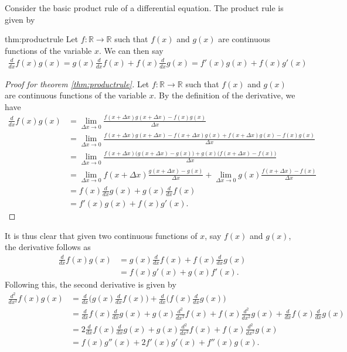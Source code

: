 Consider the basic product rule of a differential equation. The product rule is given by
\begin{theo}{thm:productrule}
	Let $f:\mathbb{R}\rightarrow\mathbb{R}$ such that $f(x)$ and $g(x)$ are continuous functions of the variable $x$. We can then say
	\begin{align*}
		\frac{d}{dx}f(x)g(x)=g(x)\frac{d}{dx}f(x)+f(x)\frac{d}{dx}g(x)=f'(x)g(x)+f(x)g'(x)
	\end{align*}
\end{theo}
\begin{proof}[Proof for theorem \ref{thm:productrule}]
	Let $f:\mathbb{R}\rightarrow\mathbb{R}$ such that $f(x)$ and $g(x)$ are continuous functions of the variable $x$. By the definition of the derivative, we have
	\begin{align*}
		\frac{d}{dx}f(x)g(x)&=\lim\limits_{\Delta x \rightarrow 0}\frac{f(x+\Delta x)g(x+\Delta x)-f(x)g(x)}{\Delta x} \\
		&=\lim\limits_{\Delta x \rightarrow 0}\frac{f(x+\Delta x)g(x+\Delta x)-f(x+\Delta x)g(x)+f(x+\Delta x)g(x)-f(x)g(x)}{\Delta x} \\
		&=\lim\limits_{\Delta x \rightarrow 0}\frac{f(x+\Delta x)\big(g(x+\Delta x)-g(x)\big)+g(x)\big(f(x+\Delta x)-f(x)\big)}{\Delta x} \\
		&=\lim\limits_{\Delta x \rightarrow 0}f(x+\Delta x)\frac{g(x+\Delta x)-g(x)}{\Delta x}+\lim\limits_{\Delta x \rightarrow 0}g(x)\frac{f(x+\Delta x)-f(x)}{\Delta x} \\
		&=f(x)\frac{d}{dx}g(x)+g(x)\frac{d}{dx}f(x) \\&=f'(x)g(x)+f(x)g'(x).
	\end{align*}
\end{proof}
It is thus clear that given two continuous functions of $x$, say $f(x)$ and $g(x)$, the derivative follows as
\begin{align}
	\frac{d}{dx}f(x)g(x)&=g(x)\frac{d}{dx}f(x)+f(x)\frac{d}{dx}g(x) \\
	&=f(x)g'(x)+g(x)f'(x).
\end{align}
Following this, the second derivative is given by
\begin{align}
	\frac{d^2}{dx^2}f(x)g(x)&=\frac{d}{dx}\bigg(g(x)\frac{d}{dx}f(x)\bigg)+\frac{d}{dx}\bigg(f(x)\frac{d}{dx}g(x)\bigg) \\
	&=\frac{d}{dx}f(x)\frac{d}{dx}g(x)+g(x)\frac{d^2}{dx^2}f(x)+f(x)\frac{d^2}{dx^2}g(x)+\frac{d}{dx}f(x)\frac{d}{dx}g(x) \\
	&=2\frac{d}{dx}f(x)\frac{d}{dx}g(x)+g(x)\frac{d^2}{dx^2}f(x)+f(x)\frac{d^2}{dx^2}g(x) \\
	&= f(x)g''(x)+2f'(x)g'(x)+f''(x)g(x).
\end{align}
